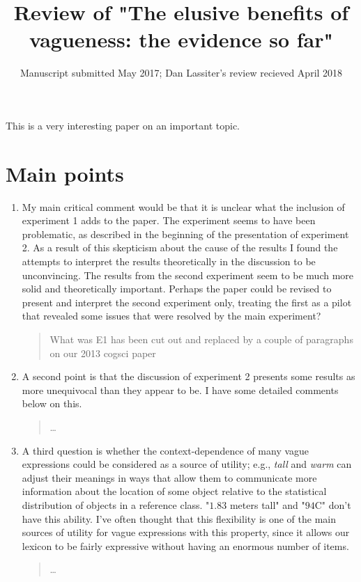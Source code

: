 \documentclass{tufte-handout}
\title{Review of "The elusive benefits of vagueness: the evidence so far"}
\date{Manuscript submitted May 2017; Dan Lassiter's review recieved April 2018}
\begin{document}
\maketitle

This is a very interesting paper on an important topic. 

\section{Main points}

\begin{enumerate}

\item My main critical comment would be that it is unclear what the inclusion of experiment 1 adds to the paper. The experiment seems to have been problematic, as described in the beginning of the presentation of experiment 2. As a result of this skepticism about the cause of the results I found the attempts to interpret the results theoretically in the discussion to be unconvincing. The results from the second experiment seem to be much more solid and theoretically important. Perhaps the paper could be revised to present and interpret the second experiment only, treating the first as a pilot that revealed some issues that were resolved by the main experiment?
\begin{quote}What was E1 has been cut out and replaced by a couple of paragraphs on our 2013 cogsci paper\end{quote}

\item A second point is that the discussion of experiment 2 presents some results as more unequivocal than they appear to be. I have some detailed comments below on this.
\begin{quote}\ldots\end{quote}

\item A third question is whether the context-dependence of many vague expressions could be considered as a source of utility; e.g., \emph{tall} and \emph{warm} can adjust their meanings in ways that allow them to communicate more information about the location of some object relative to the statistical distribution of objects in a reference class. "$1.83$ meters tall" and "$94$\textdegree C" don't have this ability. I've often thought that this flexibility is one of the main sources of utility for vague expressions with this property, since it allows our lexicon to be fairly expressive without having an enormous number of items.
\begin{quote}\ldots\end{quote}

\end{enumerate}
\end{document}
